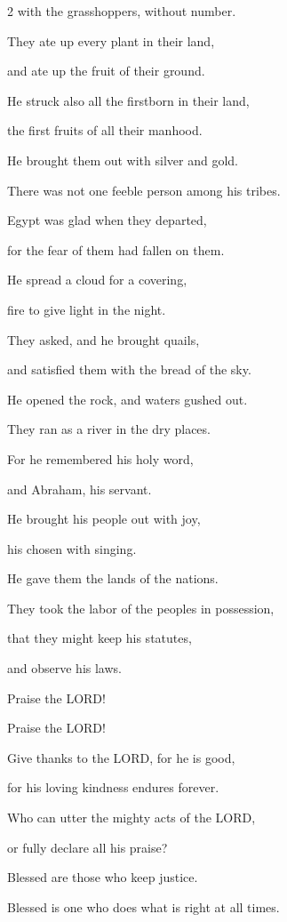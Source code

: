 \begin{multicols}{2}
	with the grasshoppers, without number.
	
	
	\myverse{}They ate up every plant in their land,
	
	and ate up the fruit of their ground.
	
	
	\myverse{}He struck also all the firstborn in their land,
	
	the first fruits of all their manhood.
	
	
	\myverse{}He brought them out with silver and gold.
	
	There was not one feeble person among his tribes.
	
	
	\myverse{}Egypt was glad when they departed,
	
	for the fear of them had fallen on them.
	
	
	\myverse{}He spread a cloud for a covering,
	
	fire to give light in the night.
	
	
	\myverse{}They asked, and he brought quails,
	
	and satisfied them with the bread of the sky.
	
	
	\myverse{}He opened the rock, and waters gushed out.
	
	They ran as a river in the dry places.
	
	
	\myverse{}For he remembered his holy word,
	
	and Abraham, his servant.
	
	
	\myverse{}He brought his people out with joy,
	
	his chosen with singing.
	
	
	\myverse{}He gave them the lands of the nations.
	
	They took the labor of the peoples in possession,
	
	
	\myverse{}that they might keep his statutes,
	
	and observe his laws.
	
	Praise the LORD!
	
	
	\mychapter{} \myverse*{}Praise the LORD!
	
	\quad\quad\quad  Give thanks to the LORD, for he is good,
	
	for his loving kindness endures forever.
	
	
	\myverse{}Who can utter the mighty acts of the LORD,
	
	or fully declare all his praise?
	
	
	\myverse{}Blessed are those who keep justice.
	
	Blessed is one who does what is right at all times.
	

\end{multicols}
